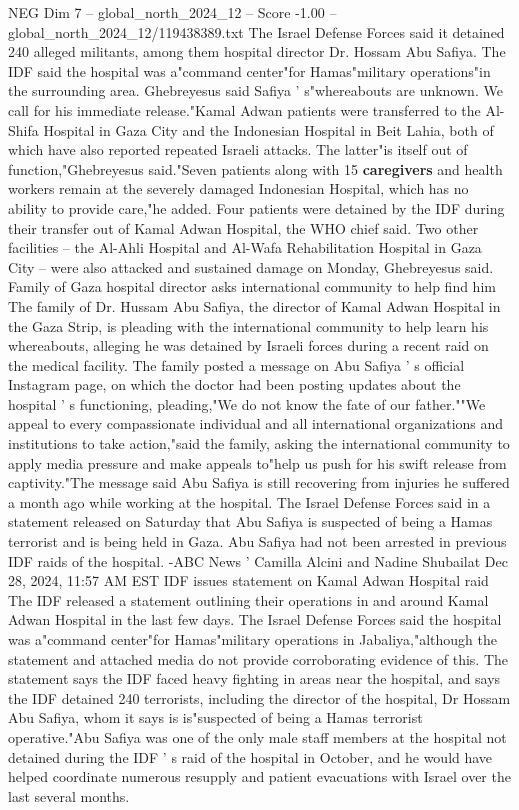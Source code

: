 \begin{textsample}{NEG Dim 7 – global\_north\_2024\_12 – Score -1.00 – global\_north\_2024\_12/119438389.txt}
The Israel Defense Forces said it detained 240 alleged militants, among them hospital director Dr.
Hossam Abu Safiya.
The IDF said the hospital was a"command center"for Hamas"military operations"in the surrounding area.
Ghebreyesus said Safiya ' s"whereabouts are unknown.
We call for his immediate release."Kamal Adwan patients were transferred to the Al-Shifa Hospital in Gaza City and the Indonesian Hospital in Beit Lahia, both of which have also reported repeated Israeli attacks.
The latter"is itself out of function,"Ghebreyesus said."Seven patients along with 15 \textbf{caregivers} and health workers remain at the severely damaged Indonesian Hospital, which has no ability to provide care,"he added.
Four patients were detained by the IDF during their transfer out of Kamal Adwan Hospital, the WHO chief said.
Two other facilities -- the Al-Ahli Hospital and Al-Wafa Rehabilitation Hospital in Gaza City -- were also attacked and sustained damage on Monday, Ghebreyesus said.
Family of Gaza hospital director asks international community to help find him The family of Dr.
Hussam Abu Safiya, the director of Kamal Adwan Hospital in the Gaza Strip, is pleading with the international community to help learn his whereabouts, alleging he was detained by Israeli forces during a recent raid on the medical facility.
The family posted a message on Abu Safiya ' s official Instagram page, on which the doctor had been posting updates about the hospital ' s functioning, pleading,"We do not know the fate of our father.""We appeal to every compassionate individual and all international organizations and institutions to take action,"said the family, asking the international community to apply media pressure and make appeals to"help us push for his swift release from captivity."The message said Abu Safiya is still recovering from injuries he suffered a month ago while working at the hospital.
The Israel Defense Forces said in a statement released on Saturday that Abu Safiya is suspected of being a Hamas terrorist and is being held in Gaza.
Abu Safiya had not been arrested in previous IDF raids of the hospital. -ABC News ' Camilla Alcini and Nadine Shubailat Dec 28, 2024, 11:57 AM EST IDF issues statement on Kamal Adwan Hospital raid The IDF released a statement outlining their operations in and around Kamal Adwan Hospital in the last few days.
The Israel Defense Forces said the hospital was a"command center"for Hamas"military operations in Jabaliya,"although the statement and attached media do not provide corroborating evidence of this.
The statement says the IDF faced heavy fighting in areas near the hospital, and says the IDF detained 240 terrorists, including the director of the hospital, Dr Hossam Abu Safiya, whom it says is is"suspected of being a Hamas terrorist operative."Abu Safiya was one of the only male staff members at the hospital not detained during the IDF ' s raid of the hospital in October, and he would have helped coordinate numerous resupply and patient evacuations with Israel over the last several months.

\end{textsample}
